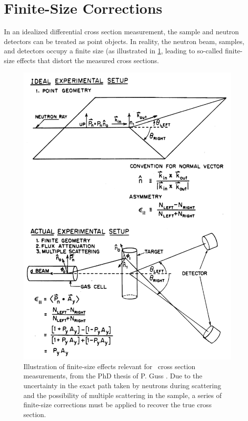 \section{Finite-Size Corrections}
In an idealized differential cross section measurement, the sample and neutron
detectors can be treated as point objects. In reality, the neutron beam,
samples, and detectors occupy a finite size (as illustrated in \ref{GussFiniteSizeDiagram},
leading to so-called finite-size effects that distort the measured cross sections.
\begin{figure}[tb]
    \centering
        \includegraphics[height=0.7\textheight]{figures/GussFiniteSizeDiagram.png}
        \caption[Illustration of finite-size effects relevant for \el\ cross
        section measurements]
        {
            Illustration of finite-size effects relevant for \el\ cross
            section measurements, from the PhD thesis of P. Guss
            \cite{GussPhDThesis}. Due to the uncertainty in the exact path taken
            by neutrons during scattering and the possibility of multiple
            scattering in the sample, a series of finite-size corrections
            must be applied to recover the true cross section.
        }
        \label{GussFiniteSizeDiagram}
\end{figure}
